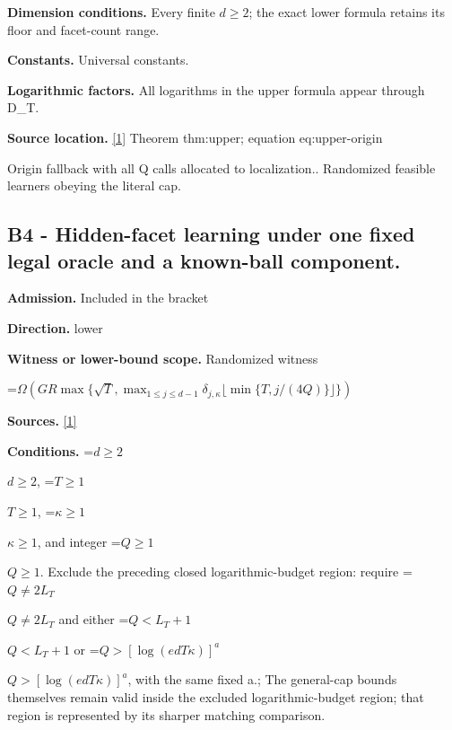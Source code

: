\documentclass[10pt,a4paper]{article}
\newcommand{\AtlasMath}[1]{\par\begingroup\centering\setbox0=\hbox{$\displaystyle #1$}\ifdim\wd0>1.4\linewidth\typeout{ATLAS WIDE FORMULA: \the\wd0}\fi\ifdim\wd0>\linewidth\resizebox{\linewidth}{!}{\box0}\else\box0\fi\par\endgroup}
\newcommand{\AtlasInlineMath}[1]{\begingroup\setbox0=\hbox{$#1$}\ifdim\wd0>.4\linewidth\endgroup\AtlasMath{#1}\else\endgroup$#1$\fi}
\begin{document}
\textbf{Dimension conditions.} Every finite $d\ge 2$; the exact lower formula retains its floor and facet-count range.



\textbf{Constants.} Universal constants.



\textbf{Logarithmic factors.} All logarithms in the upper formula appear through D\_T.



\textbf{Source location.} \href{https://github.com/WU-Wendao/Colombo/blob/main/colombo_sensorium/Complexity_altas/data/sources/colombo/U08/manuscript.pdf}{[1]} Theorem thm:upper; equation eq:upper-origin



Origin fallback with all Q calls allocated to localization.. Randomized feasible learners obeying the literal cap.



\subsection{B4 - Hidden-facet learning under one fixed legal oracle and a known-ball component.}


\textbf{Admission.} Included in the bracket



\textbf{Direction.} lower



\textbf{Witness or lower-bound scope.} Randomized witness



\AtlasMath{\Omega\!\left(GR\max\{\sqrt T,\max_{1\le j\le d-1}\delta_{j,\kappa}\lfloor\min\{T,j/(4Q)\}\rfloor\}\right)}


\textbf{Sources.} \href{https://github.com/WU-Wendao/Colombo/blob/main/colombo_sensorium/Complexity_altas/data/sources/colombo/U08/manuscript.pdf}{[1]}



\textbf{Conditions.} \AtlasInlineMath{d\ge2}, \AtlasInlineMath{T\ge1}, \AtlasInlineMath{\kappa\ge1}, and integer \AtlasInlineMath{Q\ge1}. Exclude the preceding closed logarithmic-budget region: require \AtlasInlineMath{Q\ne2L_T} and either \AtlasInlineMath{Q<L_T+1} or \AtlasInlineMath{Q>[\log(edT\kappa)]^a}, with the same fixed a.; The general-cap bounds themselves remain valid inside the excluded logarithmic-budget region; that region is represented by its sharper matching comparison.
\end{document}
